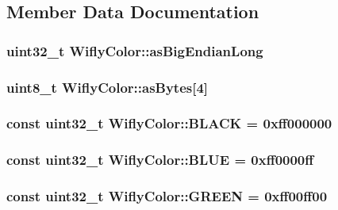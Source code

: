 \subsection{Member Data Documentation}
\hypertarget{class_wifly_color_a6af6487d17668e3c40edfd60429f0304}{
\subsubsection[{as\-Big\-Endian\-Long}]{\setlength{\rightskip}{0pt plus 5cm}uint32\-\_\-t Wifly\-Color\-::as\-Big\-Endian\-Long}}\label{class_wifly_color_a6af6487d17668e3c40edfd60429f0304}
\hypertarget{class_wifly_color_a78508053f83c1dcb963a1fdf0127e239}{
\subsubsection[{as\-Bytes}]{\setlength{\rightskip}{0pt plus 5cm}uint8\-\_\-t Wifly\-Color\-::as\-Bytes\mbox{[}4\mbox{]}}}\label{class_wifly_color_a78508053f83c1dcb963a1fdf0127e239}
\hypertarget{class_wifly_color_afa045408a6b3f401e8b7d850f120a025}{
\subsubsection[{B\-L\-A\-C\-K}]{\setlength{\rightskip}{0pt plus 5cm}const uint32\-\_\-t Wifly\-Color\-::\-B\-L\-A\-C\-K = 0xff000000\hspace{0.3cm}{\ttfamily [static]}}}\label{class_wifly_color_afa045408a6b3f401e8b7d850f120a025}
\hypertarget{class_wifly_color_ad63591638c12c2f9c5df743fceef6c43}{
\subsubsection[{B\-L\-U\-E}]{\setlength{\rightskip}{0pt plus 5cm}const uint32\-\_\-t Wifly\-Color\-::\-B\-L\-U\-E = 0xff0000ff\hspace{0.3cm}{\ttfamily [static]}}}\label{class_wifly_color_ad63591638c12c2f9c5df743fceef6c43}
\hypertarget{class_wifly_color_adb9acf98ee5417f6293ae3fa9277237d}{
\subsubsection[{G\-R\-E\-E\-N}]{\setlength{\rightskip}{0pt plus 5cm}const uint32\-\_\-t Wifly\-Color\-::\-G\-R\-E\-E\-N = 0xff00ff00\hspace{0.3cm}{\ttfamily [static]}}}\label{class_wifly_color_adb9acf98ee5417f6293ae3fa9277237d}
